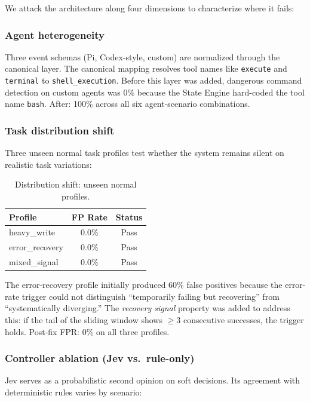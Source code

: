 \documentclass[11pt,a4paper]{article}
\begin{document}
We attack the architecture along four dimensions to characterize where it fails:

\subsubsection{Agent heterogeneity}

Three event schemas (Pi, Codex-style, custom) are normalized through the canonical layer. The canonical mapping resolves tool names like \texttt{execute} and \texttt{terminal} to \texttt{shell\_execution}. Before this layer was added, dangerous command detection on custom agents was 0\% because the State Engine hard-coded the tool name \texttt{bash}. After: 100\% across all six agent-scenario combinations.

\subsubsection{Task distribution shift}

Three unseen normal task profiles test whether the system remains silent on realistic task variations:

\begin{table}[H]
\centering
\begin{tabular}{lcc}
\toprule
\textbf{Profile} & \textbf{FP Rate} & \textbf{Status} \\
\midrule
heavy\_write & 0.0\% & Pass \\
error\_recovery & 0.0\% & Pass \\
mixed\_signal & 0.0\% & Pass \\
\bottomrule
\bottomrule
\end{tabular}
\caption{Distribution shift: unseen normal profiles.}
\end{table}

The error-recovery profile initially produced 60\% false positives because the error-rate trigger could not distinguish ``temporarily failing but recovering'' from ``systematically diverging.'' The \emph{recovery signal} property was added to address this: if the tail of the sliding window shows $\geq$3 consecutive successes, the trigger holds. Post-fix FPR: 0\% on all three profiles.

\subsubsection{Controller ablation (Jev vs.~rule-only)}

Jev serves as a probabilistic second opinion on soft decisions. Its agreement with deterministic rules varies by scenario:
\end{document}
